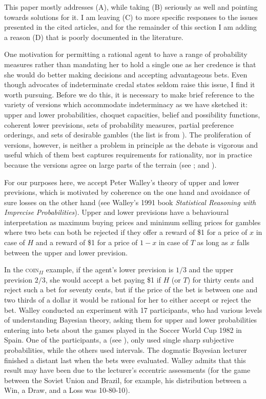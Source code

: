 \documentclass[11pt]{article}
\begin{document}
This paper mostly addresses (A), while taking (B) seriously as well
and pointing towards solutions for it. 
I am leaving (C) to more specific responses to the issues presented in
the cited articles, and for the remainder of this section I am adding
a reason (D) that is poorly documented in the literature.

One motivation for permitting a rational agent to have a range of
probability measures rather than mandating her to hold a single one as
her credence is that she would do better making decisions and
accepting advantageous bets. Even though advocates of indeterminate
credal states seldom raise this issue, I find it worth pursuing.
Before we do this, it is necessary to make brief reference to the
variety of versions which accommodate indeterminacy as we have
sketched it: upper and lower probabilities, choquet capacities, belief
and possibility functions, coherent lower previsions, sets of
probability measures, partial preference orderings, and sets of
desirable gambles (the list is from ). The
proliferation of versions, however, is neither a problem in principle
as the debate is vigorous and useful which of them best captures
requirements for rationality, nor in practice because the versions
agree on large parts of the terrain (see ; and
).

For our purposes here, we accept Peter Walley's theory of upper and
lower previsions, which is motivated by coherence on the one hand and
avoidance of sure losses on the other hand (see Walley's 1991 book
\emph{Statistical Reasoning with Imprecise Probabilities}). Upper and
lower previsions have a behavioural interpretation as maximum buying
prices and minimum selling prices for gambles where two bets can both
be rejected if they offer a reward of \$1 for a price of $x$ in case
of $H$ and a reward of \$1 for a price of $1-x$ in case of $T$ as long
as $x$ falls between the upper and lower prevision.

In the \textsc{coin}$_{II}$ example, if the agent's lower prevision is
$1/3$ and the upper prevision $2/3$, she would accept a bet paying \$1
if $H$ (or $T$) for thirty cents and reject such a bet for seventy
cents, but if the price of the bet is between one and two thirds of a
dollar it would be rational for her to either accept or reject the
bet. Walley conducted an experiment with 17 participants, who had
various levels of understanding Bayesian theory, asking them for upper
and lower probabilities entering into bets about the games played in
the Soccer World Cup 1982 in Spain. One of the participants, a
 (see ),
only used single sharp subjective probabilities, while the others used
intervals. The dogmatic Bayesian lecturer finished a distant last when
the bets were evaluated. Walley admits that this result may have been
due to the lecturer's eccentric assessments (for the game between the
Soviet Union and Brazil, for example, his distribution between a Win,
a Draw, and a Loss was 10-80-10).
\end{document}
